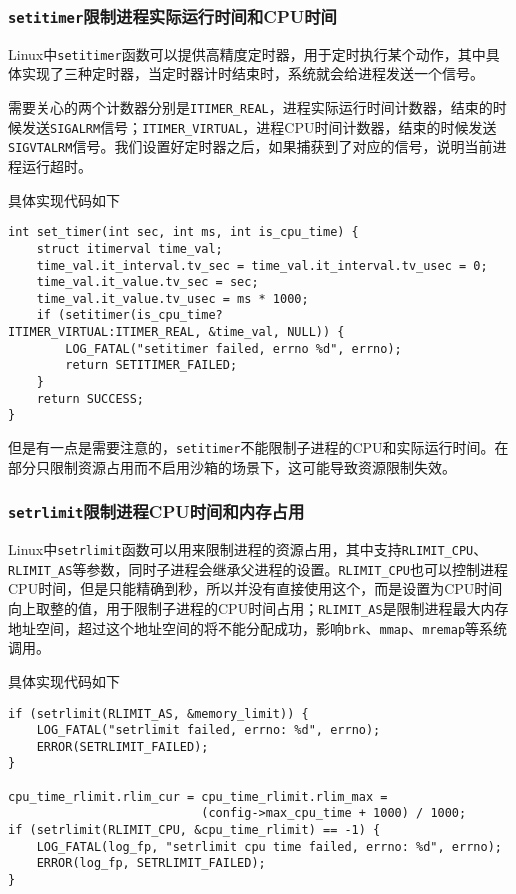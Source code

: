 \subsubsection{\texttt{setitimer}限制进程实际运行时间和CPU时间}

Linux中\texttt{setitimer}函数可以提供高精度定时器，用于定时执行某个动作，其中具体实现了三种定时器，当定时器计时结束时，系统就会给进程发送一个信号。

需要关心的两个计数器分别是\texttt{ITIMER\_REAL}，进程实际运行时间计数器，结束的时候发送\texttt{SIGALRM}信号；\texttt{ITIMER\_VIRTUAL}，进程CPU时间计数器，结束的时候发送\texttt{SIGVTALRM}信号。我们设置好定时器之后，如果捕获到了对应的信号，说明当前进程运行超时。

具体实现代码如下

\begin{verbatim}
int set_timer(int sec, int ms, int is_cpu_time) {
    struct itimerval time_val;
    time_val.it_interval.tv_sec = time_val.it_interval.tv_usec = 0;
    time_val.it_value.tv_sec = sec;
    time_val.it_value.tv_usec = ms * 1000;
    if (setitimer(is_cpu_time?ITIMER_VIRTUAL:ITIMER_REAL, &time_val, NULL)) {
        LOG_FATAL("setitimer failed, errno %d", errno);
        return SETITIMER_FAILED;
    }
    return SUCCESS;
}
\end{verbatim}

但是有一点是需要注意的，\texttt{setitimer}不能限制子进程的CPU和实际运行时间\cite{setitimer-child-process}。在部分只限制资源占用而不启用沙箱的场景下，这可能导致资源限制失效。

\subsubsection{\texttt{setrlimit}限制进程CPU时间和内存占用}

Linux中\texttt{setrlimit}函数可以用来限制进程的资源占用，其中支持\texttt{RLIMIT\_CPU}、\texttt{RLIMIT\_AS}等参数，同时子进程会继承父进程的设置。\texttt{RLIMIT\_CPU}也可以控制进程CPU时间，但是只能精确到秒，所以并没有直接使用这个，而是设置为CPU时间向上取整的值，用于限制子进程的CPU时间占用；\texttt{RLIMIT\_AS}是限制进程最大内存地址空间，超过这个地址空间的将不能分配成功，影响\texttt{brk}、\texttt{mmap}、\texttt{mremap}等系统调用。

具体实现代码如下

\begin{verbatim}
if (setrlimit(RLIMIT_AS, &memory_limit)) {
    LOG_FATAL("setrlimit failed, errno: %d", errno);
    ERROR(SETRLIMIT_FAILED);
}

cpu_time_rlimit.rlim_cur = cpu_time_rlimit.rlim_max = 
                           (config->max_cpu_time + 1000) / 1000;
if (setrlimit(RLIMIT_CPU, &cpu_time_rlimit) == -1) {
    LOG_FATAL(log_fp, "setrlimit cpu time failed, errno: %d", errno);
    ERROR(log_fp, SETRLIMIT_FAILED);
}
\end{verbatim}

